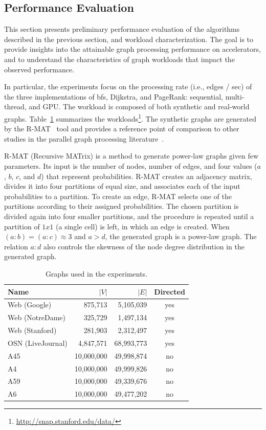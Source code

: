 \subsection{Performance Evaluation}
\label{sec:evaluation}

This section presents preliminary performance evaluation of the algorithms described in the previous section, and workload characterization. The goal is to provide insights into the attainable graph processing performance on accelerators, and to understand the characteristics of graph workloads that impact the observed performance. 

In particular, the experiments focus on the processing rate (i.e., edges / sec) of the three implementations of {\sc bfs}, Dijkstra, and PageRank: sequential, multi-thread, and GPU. The workload is composed of both synthetic and real-world graphs. Table~\ref{tab:workload} summarizes the workloads\footnote{\url{http://snap.stanford.edu/data/}}. The synthetic graphs are generated by the R-MAT~\cite{rmat} tool and provides a reference point of comparison to other studies in the parallel graph processing literature~\cite{agarwal2010scalable}.

R-MAT (Recursive MATrix) \cite{rmat} is a method to generate power-law graphs given few parameters. Its input is the number of nodes, number of edges, and four values ($a$, $b$, $c$, and $d$) that represent probabilities. R-MAT creates an adjacency matrix, divides it into four partitions of equal size, and associates each of the input probabilities to a partition. To create an edge, R-MAT selects one of the partitions according to their assigned probabilities. The chosen partition is divided again into four smaller partitions, and the procedure is repeated until a partition of $1 x 1$ (a single cell) is left, in which an edge is created. When $(a : b) = (a : c) \approx 3$ and $a > d$, the generated graph is a power-law graph. The relation $a : d$ also controls the skewness of the node degree distribution in the generated graph.

\begin{table}[ht]
\centering
\begin{tabular}{l|r|r|c}
Name              & $|V|$   & $|E|$      & Directed \\\hline
Web (Google)      & 875,713 & 5,105,039  & yes      \\\hline
Web (NotreDame)   & 325,729 & 1,497,134  & yes      \\\hline
Web (Stanford)    & 281,903 & 2,312,497  & yes      \\\hline
OSN (LiveJournal) & 4,847,571 & 68,993,773 & yes    \\\hline
A45         & 10,000,000 & 49,998,874 & no \\\hline
A4          & 10,000,000 & 49,999,826 & no \\\hline
A59         & 10,000,000 & 49,339,676 & no \\\hline
A6          & 10,000,000 & 49,477,202 & no \\\hline
\end{tabular}
\caption{Graphs used in the experiments.}
\label{tab:workload}
\end{table}

